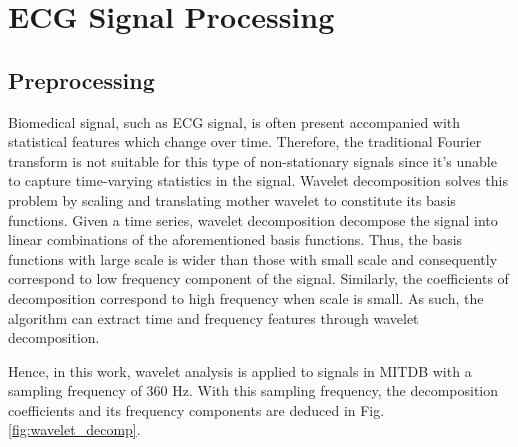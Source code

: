 
\section{ECG Signal Processing}

\subsection{Preprocessing}
Biomedical signal, such as ECG signal, is often present accompanied with statistical features which change over time. Therefore, the traditional Fourier transform is not suitable for this type of non-stationary signals since it's unable to capture time-varying statistics in the signal. Wavelet decomposition solves this problem by scaling and translating mother wavelet to constitute its basis functions. Given a time series, wavelet decomposition decompose the signal into linear combinations of the aforementioned basis functions. Thus, the basis functions with large scale is wider than those with small scale and consequently correspond to low frequency component of the signal. Similarly, the coefficients of decomposition correspond to high frequency when scale is small. As such, the algorithm can extract time and frequency features through wavelet decomposition. 

Hence, in this work, wavelet analysis is applied to signals in MITDB with a sampling frequency of 360 Hz. With this sampling frequency, the decomposition coefficients and its frequency components are deduced in Fig.\ref{fig:wavelet_decomp}.

